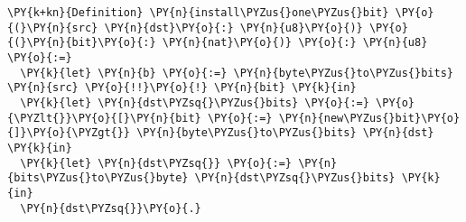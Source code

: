 \begin{Verbatim}[commandchars=\\\{\},codes={\catcode`\$=3\catcode`\^=7\catcode`\_=8},fontsize=\small]
\PY{k+kn}{Definition} \PY{n}{install\PYZus{}one\PYZus{}bit} \PY{o}{(}\PY{n}{src} \PY{n}{dst}\PY{o}{:} \PY{n}{u8}\PY{o}{)} \PY{o}{(}\PY{n}{bit}\PY{o}{:} \PY{n}{nat}\PY{o}{)} \PY{o}{:} \PY{n}{u8} \PY{o}{:=}
  \PY{k}{let} \PY{n}{b} \PY{o}{:=} \PY{n}{byte\PYZus{}to\PYZus{}bits} \PY{n}{src} \PY{o}{!!}\PY{o}{!} \PY{n}{bit} \PY{k}{in}
  \PY{k}{let} \PY{n}{dst\PYZsq{}\PYZus{}bits} \PY{o}{:=} \PY{o}{\PYZlt{}}\PY{o}{[}\PY{n}{bit} \PY{o}{:=} \PY{n}{new\PYZus{}bit}\PY{o}{]}\PY{o}{\PYZgt{}} \PY{n}{byte\PYZus{}to\PYZus{}bits} \PY{n}{dst} \PY{k}{in}
  \PY{k}{let} \PY{n}{dst\PYZsq{}} \PY{o}{:=} \PY{n}{bits\PYZus{}to\PYZus{}byte} \PY{n}{dst\PYZsq{}\PYZus{}bits} \PY{k}{in}
  \PY{n}{dst\PYZsq{}}\PY{o}{.}
\end{Verbatim}
